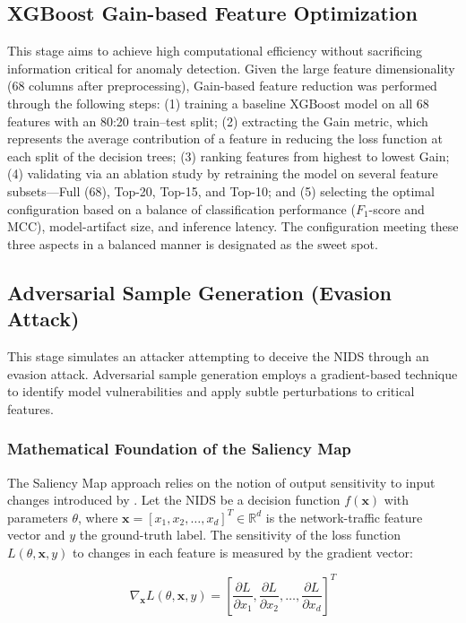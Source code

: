 \documentclass[11pt, a4paper]{article}
\begin{document}
\subsection{XGBoost Gain-based Feature Optimization}
This stage aims to achieve high computational efficiency without sacrificing information critical for anomaly detection. Given the large feature dimensionality (68 columns after preprocessing), Gain-based feature reduction \citep{ref_xgboost} was performed through the following steps: (1) training a baseline XGBoost model on all 68 features with an 80:20 train--test split; (2) extracting the Gain metric, which represents the average contribution of a feature in reducing the loss function at each split of the decision trees; (3) ranking features from highest to lowest Gain; (4) validating via an ablation study by retraining the model on several feature subsets---Full (68), Top-20, Top-15, and Top-10; and (5) selecting the optimal configuration based on a balance of classification performance ($F_1$-score and MCC), model-artifact size, and inference latency. The configuration meeting these three aspects in a balanced manner is designated as the sweet spot.

\subsection{Adversarial Sample Generation (Evasion Attack)}
This stage simulates an attacker attempting to deceive the NIDS through an evasion attack. Adversarial sample generation employs a gradient-based technique \citep{ref_szegedy} to identify model vulnerabilities and apply subtle perturbations to critical features.

\subsubsection{Mathematical Foundation of the Saliency Map}
The Saliency Map approach relies on the notion of output sensitivity to input changes introduced by \citet{ref_saliency}. Let the NIDS be a decision function $f(\mathbf{x})$ with parameters $\theta$, where $\mathbf{x} = [x_1, x_2, \dots, x_d]^T \in \mathbb{R}^d$ is the network-traffic feature vector and $y$ the ground-truth label. The sensitivity of the loss function $L(\theta, \mathbf{x}, y)$ to changes in each feature is measured by the gradient vector:

\begin{equation}
\nabla_{\mathbf{x}} L(\theta, \mathbf{x}, y) = \left[ \frac{\partial L}{\partial x_1}, \frac{\partial L}{\partial x_2}, \dots, \frac{\partial L}{\partial x_d} \right]^T
\end{equation}
\end{document}
